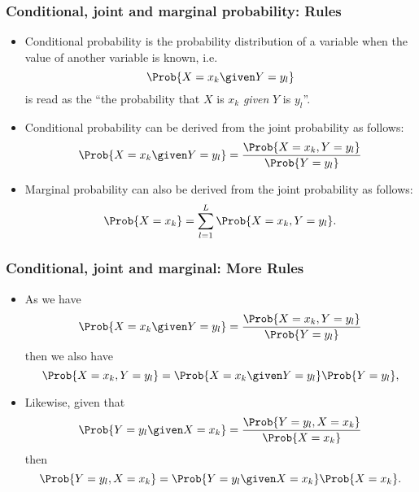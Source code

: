 \documentclass[10pt,xcolor=dvipsnames,serif,professionalfont]{beamer} %
\begin{document}
\begin{frame}
\frametitle{Conditional, joint and marginal probability: Rules}
\begin{itemize}
\item Conditional probability is the probability distribution of a variable when the value of another variable is known, i.e. 
\begin{equation}
\Prob{X=x_k \given Y=y_l } 
\end{equation}
is read as the ``the probability that $X$ is $x_k$ \emph{given} $Y$ is $y_l$''.
\item Conditional probability can be derived from the joint probability as follows:
\begin{equation}
\Prob{X=x_k \given Y=y_l } = \frac{\Prob{X=x_k, Y=y_l }}{ \Prob{Y=y_l } }
\end{equation}
\item Marginal probability can also be derived from the joint probability as follows:
\begin{equation}
\Prob{X=x_k} = \sum_{l=1}^L \Prob{X=x_k, Y=y_l }.
\end{equation}
\end{itemize}
\end{frame}

\begin{frame}
\frametitle{Conditional, joint and marginal: More Rules}
\begin{itemize}
\item As we have
\begin{equation}
\Prob{X=x_k \given Y=y_l } = \frac{\Prob{X=x_k, Y=y_l }}{ \Prob{Y=y_l } }
\end{equation}
then we also have 
\begin{equation}
\Prob{X=x_k,Y=y_l} = \Prob{X=x_k\given Y=y_l}\Prob{Y=y_l},
\end{equation}
\item Likewise, given that
\begin{equation}
\Prob{Y=y_l \given X=x_k} = \frac{\Prob{Y=y_l,X=x_k}}{\Prob{X=x_k}}
\end{equation}
then 
\begin{equation}
\Prob{Y=y_l,X=x_k} = \Prob{Y=y_l \given X=x_k}\Prob{X=x_k}.
\end{equation}
\end{itemize}
\end{frame}
\end{document}

